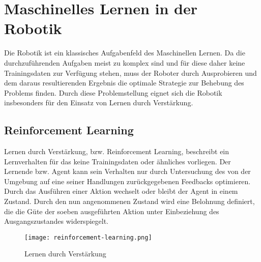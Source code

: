 \chapter{Maschinelles Lernen in der Robotik}

Die Robotik ist ein klassisches Aufgabenfeld des Maschinellen Lernen. Da die durch\-zu\-führenden Aufgaben meist zu komplex sind und für diese daher keine Trainingsdaten zur Verfügung stehen, muss der Roboter durch Ausprobieren und dem daraus resultierenden Ergebnis die optimale Strategie zur Behebung des Problems finden. Durch diese Problemstellung eignet sich die Robotik insbesonders für den Einsatz von Lernen durch Verstärkung. \cite{Ertel_2013}

\section{Reinforcement Learning}

Lernen durch Verstärkung, bzw. Reinforcement Learning, beschreibt ein Lernverhalten für das keine Trainingsdaten oder ähnliches vorliegen. Der Lernende bzw. Agent kann sein Verhalten nur durch Untersuchung des von der Umgebung auf eine seiner Handlungen zurückgegebenen Feedbacks optimieren. Durch das Ausführen einer Aktion wechselt oder bleibt der Agent in einem Zustand. Durch den nun angenommenen Zustand wird eine Belohnung definiert, die die Güte der soeben ausgeführten Aktion unter Einbeziehung des Ausgangszustandes widerspiegelt. \cite{Ertel_2013}\par

\begin{figure}[H]
	\centering
	\texttt{[image: reinforcement-learning.png]}
	\caption{Lernen durch Verstärkung}
	\label{fig:reinforcement-learning}
\end{figure}

